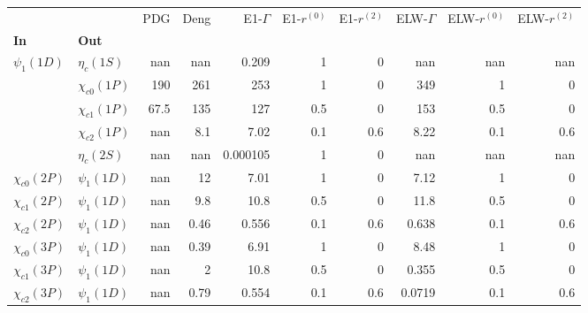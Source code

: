 \begin{tabular}{l|l|r|r|r|r|r|r|r|r}
\toprule
                &                &  PDG &  Deng &  E1-$\Gamma$ &  E1-$r^{(0)}$ &  E1-$r^{(2)}$ &  ELW-$\Gamma$ &  ELW-$r^{(0)}$ &  ELW-$r^{(2)}$ \\
\textbf{In} & \textbf{Out} &      &       &              &               &               &               &                &                \\
\midrule
\textbf{$\psi_{1}(1D)$} & \textbf{$\eta_{c}(1S)$} &  nan &   nan &        0.209 &             1 &             0 &           nan &            nan &            nan \\
                & \textbf{$\chi_{c0}(1P)$} &  190 &   261 &          253 &             1 &             0 &           349 &              1 &              0 \\
                & \textbf{$\chi_{c1}(1P)$} & 67.5 &   135 &          127 &           0.5 &             0 &           153 &            0.5 &              0 \\
                & \textbf{$\chi_{c2}(1P)$} &  nan &   8.1 &         7.02 &           0.1 &           0.6 &          8.22 &            0.1 &            0.6 \\
                & \textbf{$\eta_{c}(2S)$} &  nan &   nan &     0.000105 &             1 &             0 &           nan &            nan &            nan \\
\textbf{$\chi_{c0}(2P)$} & \textbf{$\psi_{1}(1D)$} &  nan &    12 &         7.01 &             1 &             0 &          7.12 &              1 &              0 \\
\textbf{$\chi_{c1}(2P)$} & \textbf{$\psi_{1}(1D)$} &  nan &   9.8 &         10.8 &           0.5 &             0 &          11.8 &            0.5 &              0 \\
\textbf{$\chi_{c2}(2P)$} & \textbf{$\psi_{1}(1D)$} &  nan &  0.46 &        0.556 &           0.1 &           0.6 &         0.638 &            0.1 &            0.6 \\
\textbf{$\chi_{c0}(3P)$} & \textbf{$\psi_{1}(1D)$} &  nan &  0.39 &         6.91 &             1 &             0 &          8.48 &              1 &              0 \\
\textbf{$\chi_{c1}(3P)$} & \textbf{$\psi_{1}(1D)$} &  nan &     2 &         10.8 &           0.5 &             0 &         0.355 &            0.5 &              0 \\
\textbf{$\chi_{c2}(3P)$} & \textbf{$\psi_{1}(1D)$} &  nan &  0.79 &        0.554 &           0.1 &           0.6 &        0.0719 &            0.1 &            0.6 \\
\bottomrule
\end{tabular}
